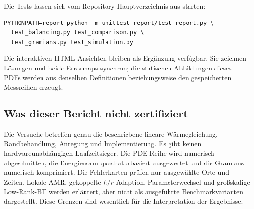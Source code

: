 \documentclass[11pt,a4paper]{article}
\begin{document}
Die Tests lassen sich vom Repository-Hauptverzeichnis aus starten:
\begin{verbatim}
PYTHONPATH=report python -m unittest report/test_report.py \
  test_balancing.py test_comparison.py \
  test_gramians.py test_simulation.py
\end{verbatim}
Die interaktiven HTML-Ansichten bleiben als Ergänzung verfügbar. Sie zeichnen Lösungen und beide Errormaps synchron; die statischen Abbildungen dieses PDFs werden aus denselben Definitionen beziehungsweise den gespeicherten Messreihen erzeugt.

\subsection{Was dieser Bericht nicht zertifiziert}
Die Versuche betreffen genau die beschriebene lineare Wärmegleichung, Randbehandlung, Anregung und Implementierung. Es gibt keinen hardwareunabhängigen Laufzeitsieger. Die PDE-Reihe wird numerisch abgeschnitten, die Energienorm quadraturbasiert ausgewertet und die Gramians numerisch komprimiert. Die Fehlerkarten prüfen nur ausgewählte Orte und Zeiten. Lokale AMR, gekoppelte $h/r$-Adaption, Parameterwechsel und großskalige Low-Rank-BT werden erläutert, aber nicht als ausgeführte Benchmarkvarianten dargestellt. Diese Grenzen sind wesentlich für die Interpretation der Ergebnisse.
\end{document}
